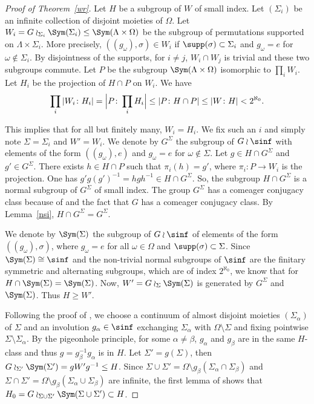 \begin{proof}[Proof of Theorem~\ref{wr}] Let $H$ be a subgroup of $W$ of small index. Let $(\Sigma_i)$ be an infinite collection of disjoint moieties of $\Omega$. Let $W_i=G\wr_{\Sigma_i} \Sym(\Sigma_i)\leq\Sym(\Lambda\times \Omega)$ be the subgroup of permutations supported on $\Lambda\times\Sigma_i$. More precisely, $\left((g_\omega),\sigma\right)\in W_i$ if $\supp(\sigma)\subset \Sigma_i$ and $g_\omega=e$ for $\omega\notin \Sigma_i$. By disjointness of the supports, for $i\neq j$, $W_i\cap W_j$ is trivial and these two subgroups commute. Let $P$ be the subgroup $\Sym(\Lambda\times \Omega)$ isomorphic to $\prod_i W_i$. Let $H_i$ be the projection of $H\cap P$ on $W_i$. We have
\[
\prod_{i}|W_i\colon H_i|=\Bigl|P\colon \prod_{i}H_i\Bigr|\leq|P\colon H\cap P|\leq|W\colon H|<2^{\aleph_0}.
\]

This implies that for all but finitely many, $W_i=H_i$. We fix such an $i$ and simply note $\Sigma=\Sigma_i$ and $W'=W_i$. We denote by $G^\Sigma$ the subgroup of $G\wr\sinf$ with elements of the form $((g_\omega),e)$ and $g_\omega=e$ for $\omega\notin \Sigma$. Let $g\in H\cap G^\Sigma$ and $g'\in G^\Sigma$. There exists $h\in H\cap P$ such that $\pi_i(h)=g'$, where $\pi_i\colon P\to W_i$ is the projection. One has $g'g(g')^{-1}= hgh^{-1}\in H\cap G^\Sigma$. So, the subgroup $H\cap G^\Sigma$ is a normal subgroup of $G^\Sigma$ of small index. The group $G^\Sigma$ has a comeager conjugacy class because of \cite[Lem.\,11]{Rosendal-Solecki} and the fact that $G$ has a comeager conjugacy class. By Lemma~\ref{nsi}, $H\cap G^\Sigma=G^\Sigma$.

We denote by $\Sym(\Sigma)$ the subgroup of $G\wr\sinf$ of elements of the form $((g_\omega),\sigma)$, where $g_\omega=e$ for all $\omega\in\Omega$ and $\supp(\sigma)\subset \Sigma$. Since $\Sym(\Sigma)\cong\sinf$ and the non-trivial normal subgroups of $\sinf$ are the finitary symmetric and alternating subgroups, which are of index $2^{\aleph_0}$, we know that for $H\cap \Sym(\Sigma)=\Sym(\Sigma)$. Now, $W'=G\wr_\Sigma\Sym(\Sigma)$ is generated by $G^\Sigma$ and $\Sym(\Sigma)$. Thus $H\geq W'$.

Following the proof of \cite[Th.\,1]{MR859950}, we choose a continuum of almost disjoint moieties $(\Sigma_\alpha)$ of $\Sigma$ and an involution $g_\alpha\in\sinf$ exchanging $\Sigma_\alpha$ with $\Omega\setminus\Sigma$ and fixing pointwise $\Sigma\setminus\Sigma_\alpha$. By the pigeonhole principle, for some $\alpha\neq\beta$, $g_\alpha$ and $g_\beta$ are in the same $H$-class and thus $g=g_\beta^{-1} g_\alpha$ is in $H$. Let $\Sigma'=g(\Sigma)$, then $G\wr_{\Sigma'}\Sym(\Sigma')=gW'g^{-1}\leq H$. Since $\Sigma\cup\Sigma'=\Omega\setminus g_\beta(\Sigma_\alpha\cap\Sigma_\beta)$ and $\Sigma\cap\Sigma'=\Omega\setminus g_\beta(\Sigma_\alpha\cup\Sigma_\beta)$ are infinite, the first lemma of \cite{MR859950} shows that $H_0=G\wr_{\Sigma\cup\Sigma'}\Sym(\Sigma\cup\Sigma')\subset H$.


\end{proof}
